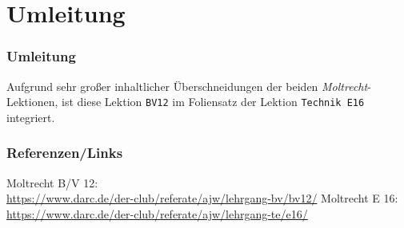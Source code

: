 

\subtitle{Betriebstechnik/Vorschriften 12: \\
  Digitale Betriebsarten \\[2em]}
\date{Stand 18.09.2017}


\section{Umleitung}

\begin{frame}
  \frametitle{Umleitung}

  Aufgrund sehr großer inhaltlicher Überschneidungen der beiden
  \emph{Moltrecht}-Lektionen, ist diese Lektion
  \texttt{BV12}\hyperlink{refs}{\cite{bv12}} im Foliensatz der Lektion
  \texttt{Technik E16}\hyperlink{refs}{\cite{e16}} integriert.

\end{frame}

\renewcommand{\refname}{Referenzen}

\begin{frame}
  \frametitle{Referenzen/Links}
  \hypertarget{refs}{}
  \footnotesize

  \begin{thebibliography}{}
      Moltrecht B/V 12: \\
      \url{https://www.darc.de/der-club/referate/ajw/lehrgang-bv/bv12/}
       Moltrecht E 16: \\
      \url{https://www.darc.de/der-club/referate/ajw/lehrgang-te/e16/}
  \end{thebibliography}

\end{frame}


